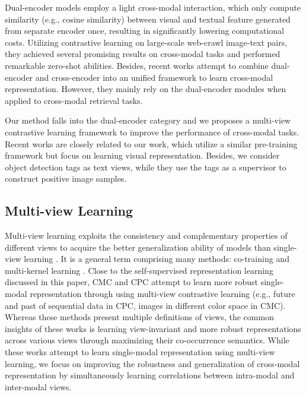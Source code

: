 \documentclass{article}
\begin{document}
Dual-encoder models \cite{Jia2021ScalingUV,Radford2021LearningTV,Yuan2021MultimodalCT,DBLP:journals/corr/abs-2111-07783,Jain2021MURALMM} employ a light cross-modal interaction, which only compute similarity  (e.g., cosine similarity) between visual and textual feature generated from separate encoder once, resulting in significantly lowering computational costs. Utilizing contrastive learning on large-scale web-crawl image-text pairs, they achieved several promising results on cross-modal tasks and performed remarkable zero-shot abilities. Besides, recent works \cite{singh2021flava,yuan2021florence,Li2021AlignBF,yu2022coca} attempt to combine dual-encoder and cross-encoder into an unified framework to learn cross-modal representation. However, they mainly rely on the dual-encoder modules when applied to cross-modal retrieval tasks.


Our method falls into the dual-encoder category and we proposes a multi-view contrastive learning framework to improve the performance of cross-modal tasks.
Recent works \cite{Yuan2021MultimodalCT,mu2021slip} are closely related to our work, which utilize a similar pre-training framework but focus on learning visual representation. Besides, we consider object detection tags as text views, while they use the tags as a supervisor to construct positive image samples.


\subsection {Multi-view Learning}
Multi-view learning exploits the consistency and complementary properties of different views to acquire the better generalization ability of models than single-view learning \cite{Xu2013ASO}. It is a general term comprising many methods: co-training \cite{Blum1998CombiningLA} and multi-kernel learning \cite{Cortes2009LearningNC}. 
Close to the self-supervised representation learning discussed in this paper, CMC \cite{Tian2020ContrastiveMC} and CPC \cite{hassani2020contrastive} attempt to learn more robust single-modal representation through using multi-view contrastive learning (e.g., future and past of sequential data in CPC, images in different color space in CMC). Whereas these methods present multiple definitions of views, the common insights of these works is learning view-invariant and more robust representations across various views through maximizing their co-occurrence semantics. 
While these works attempt to learn single-modal representation using multi-view learning, we focus on improving the robustness and generalization of cross-modal representation by simultaneously learning correlations between intra-modal and inter-modal views.
\end{document}
